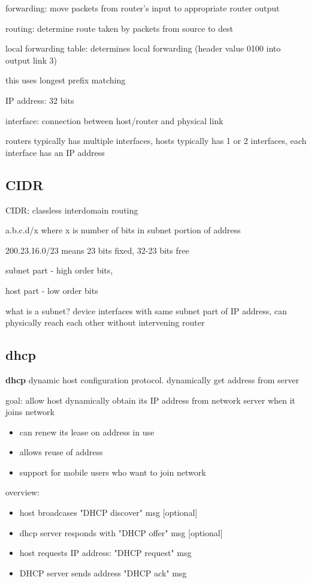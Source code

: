 \documentclass[10pt]{article}
\theoremstyle{break}
\begin{document}
forwarding: move packets from router's input to appropriate router output

routing: determine route taken by packets from source to dest 

local forwarding table: determines local forwarding (header value 0100 into output link 3)

this uses longest prefix matching

IP address: 32 bits 

interface: connection between host/router and physical link 

routers typically has multiple interfaces, hosts typically has 1 or 2 interfaces, each interface has an IP address 

\subsection{CIDR}
CIDR: classless interdomain routing

a.b.c.d/x where x is number of bits in subnet portion of address 

200.23.16.0/23 means 23 bits fixed, 32-23 bits free

subnet part - high order bits,

host part - low order bits 

what is a subnet? device interfaces with same subnet part of IP address, can physically reach each other without intervening router

\subsection{dhcp}
\textbf{dhcp} dynamic host configuration protocol. dynamically get address from server

goal: allow host dynamically obtain its IP address from network server when it joins network
\begin{itemize}
    \item can renew its lease on address in use 
    \item allows reuse of address 
    \item support for mobile users who want to join network
\end{itemize}

overview: 
\begin{itemize}
    \item host broadcases "DHCP discover" msg [optional]
    \item dhcp server responds with "DHCP offer" msg [optional]
    \item host requests IP address: "DHCP request" msg 
    \item DHCP server sends address "DHCP ack" msg
\end{itemize}
\end{document}
